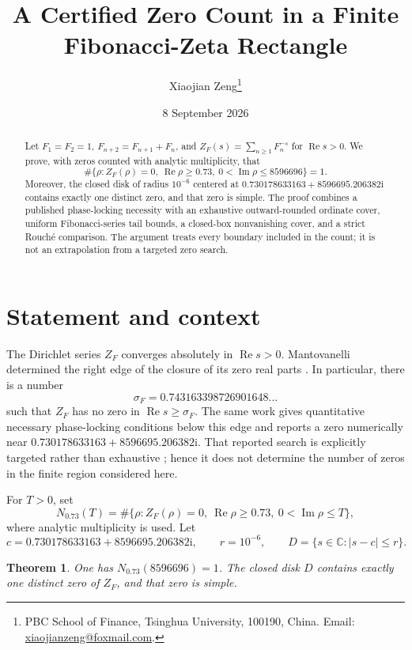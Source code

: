 \documentclass[11pt]{article}
\title{A Certified Zero Count in a Finite Fibonacci-Zeta Rectangle}
\author{Xiaojian Zeng\thanks{PBC School of Finance, Tsinghua University,
100190, China. Email: \href{mailto:xiaojianzeng@foxmail.com}{xiaojianzeng@foxmail.com}.}}
\date{8 September 2026}
\newtheorem{theorem}{Theorem}
\theoremstyle{remark}
\newcommand{\C}{\mathbb{C}}
\newcommand{\ii}{\mathrm{i}}
\newcommand{\ZF}{Z_F}
\newcommand{\real}{\operatorname{Re}}
\newcommand{\imag}{\operatorname{Im}}
\begin{document}
\maketitle

\begin{abstract}
Let $F_1=F_2=1$, $F_{n+2}=F_{n+1}+F_n$, and
$\ZF(s)=\sum_{n\geq 1}F_n^{-s}$ for $\real s>0$.  We prove, with zeros
counted with analytic multiplicity, that
\[
 \#\{\rho:\ZF(\rho)=0,\ \real\rho\geq0.73,\
                 0<\imag\rho\leq8596696\}=1.
\]
Moreover, the closed disk of radius $10^{-6}$ centered at
$0.730178633163+8596695.206382\ii$ contains exactly one distinct zero,
and that zero is simple.  The proof combines a published phase-locking
necessity with an exhaustive outward-rounded ordinate cover, uniform
Fibonacci-series tail bounds, a closed-box nonvanishing cover, and a strict
Rouch\'e comparison.  The argument treats every boundary included in the
count; it is not an extrapolation from a targeted zero search.
\end{abstract}

\section{Statement and context}

The Dirichlet series $\ZF$ converges absolutely in $\real s>0$.  Mantovanelli
determined the right edge of the closure of its zero real parts
\cite{Mantovanelli2026}.  In particular, there is a number
\[
 \sigma_F=0.743163398726901648\ldots
\]
such that $\ZF$ has no zero in $\real s\geq\sigma_F$.  The same work gives
quantitative necessary phase-locking conditions below this edge and reports
a zero numerically near
$0.730178633163+8596695.206382\ii$.  That reported search is explicitly
targeted rather than exhaustive \cite[Section~7]{Mantovanelli2026}; hence it
does not determine the number of zeros in the finite region considered here.

For $T>0$, set
\[
 N_{0.73}(T)=\#\{\rho:\ZF(\rho)=0,\ \real\rho\geq0.73,\
                                  0<\imag\rho\leq T\},
\]
where analytic multiplicity is used.  Let
\[
 c=0.730178633163+8596695.206382\ii,
 \qquad r=10^{-6},
 \qquad D=\{s\in\C:|s-c|\leq r\}.
\]

\begin{theorem}\label{thm:main}
One has $N_{0.73}(8596696)=1$.  The closed disk $D$ contains exactly one
distinct zero of $\ZF$, and that zero is simple.
\end{theorem}
\end{document}
